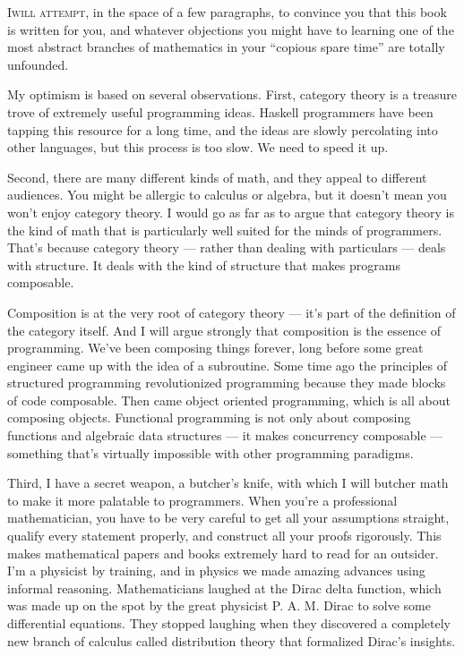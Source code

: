 %
%

\lettrine[lhang=0.17]{I}{will attempt}, in the space of a few paragraphs,
to convince you that this book is written for you, and whatever
objections you might have to learning one of the most abstract branches
of mathematics in your ``copious spare time'' are totally unfounded.

My optimism is based on several observations. First, category theory is
a treasure trove of extremely useful programming ideas. Haskell
programmers have been tapping this resource for a long time, and the
ideas are slowly percolating into other languages, but this process is
too slow. We need to speed it up.

Second, there are many different kinds of math, and they appeal to
different audiences. You might be allergic to calculus or algebra, but
it doesn't mean you won't enjoy category theory. I would go as far as
to argue that category theory is the kind of math that is particularly
well suited for the minds of programmers. That's because category theory
--- rather than dealing with particulars --- deals with structure. It
deals with the kind of structure that makes programs composable.

Composition is at the very root of category theory --- it's part of the
definition of the category itself. And I will argue strongly that
composition is the essence of programming. We've been composing things
forever, long before some great engineer came up with the idea of a
subroutine. Some time ago the principles of structured programming
revolutionized programming because they made blocks of code composable.
Then came object oriented programming, which is all about composing
objects. Functional programming is not only about composing functions
and algebraic data structures --- it makes concurrency composable ---
something that's virtually impossible with other programming paradigms.

Third, I have a secret weapon, a butcher's knife, with which I will
butcher math to make it more palatable to programmers. When you're a
professional mathematician, you have to be very careful to get all your
assumptions straight, qualify every statement properly, and construct
all your proofs rigorously. This makes mathematical papers and books
extremely hard to read for an outsider. I'm a physicist by training, and
in physics we made amazing advances using informal reasoning.
Mathematicians laughed at the Dirac delta function, which was made up on
the spot by the great physicist P. A. M. Dirac to solve some
differential equations. They stopped laughing when they discovered a
completely new branch of calculus called distribution theory that
formalized Dirac's insights.

